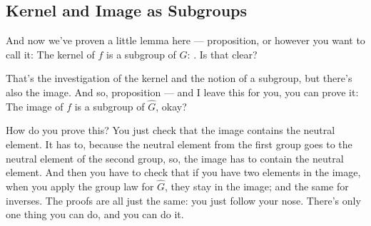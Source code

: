 \subsection{Kernel and Image as Subgroups}

\begin{speech}[00:26:29 - 00:28:05]
And now we've proven a little lemma here --- proposition, or however you want to call it: The kernel of $f$ is a subgroup of $G$: . Is that clear?

That's the investigation of the kernel and the notion of a subgroup, but there's also the image. And so, proposition --- and I leave this for you, you can prove it: The image of $f$ is a subgroup of $\hat{G}$,  okay?

How do you prove this? You just check that the image contains the neutral element. It has to, because the neutral element from the first group goes to the neutral element of the second group, so, the image has to contain the neutral element. And then you have to check that if you have two elements in the image, when you apply the group law for $\hat{G}$, they stay in the image; and the same for inverses. The proofs are all just the same: you just follow your nose. There's only one thing you can do, and you can do it.
\end{speech}

